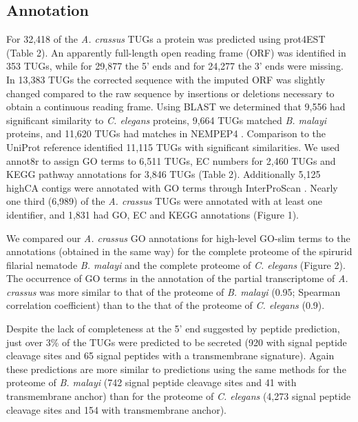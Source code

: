 \documentclass[10pt]{bmc_article}
\newenvironment{bmcformat}{\begin{raggedright}\baselineskip20pt\sloppy\setboolean{publ}{false}}{\end{raggedright}\baselineskip20pt\sloppy}
\begin{document}
\begin{bmcformat}












\subsection*{Annotation}

For
32,418
of the \textit{A. crassus} TUGs a protein was predicted using prot4EST
\cite{wasmuth_prot4est:_2004} (Table 2). An apparently full-length
open reading frame (ORF) was identified in
353 TUGs,
while for 29,877
the 5' ends and for
24,277 the 3'
ends were missing. In 13,383 TUGs the
corrected sequence with the imputed ORF was slightly changed compared
to the raw sequence by insertions or deletions necessary to obtain a
continuous reading frame. Using BLAST we determined that
9,556
had significant similarity to \textit{C. elegans} proteins,
9,664
TUGs matched \textit{B. malayi} proteins, and
11,620
TUGs had matches in NEMPEP4 \cite{parkinson_nembase:resource_2004,
  pmid21550347}. Comparison to the UniProt reference identified
11,115
TUGs with significant similarities. We used annot8r
\cite{schmid_annot8r:_2008} to assign GO terms to 6,511
TUGs, EC numbers for 2,460 TUGs and KEGG pathway annotations
for 3,846 TUGs (Table 2). Additionally 5,125
highCA contigs were annotated with GO terms through InterProScan
\cite{pmid11590104}. Nearly one third (6,989) of
the \textit{A. crassus} TUGs were annotated with at least one
identifier, and 1,831 had GO, EC and KEGG
annotations (Figure 1).

We compared our \textit{A. crassus} GO annotations for high-level
GO-slim terms to the annotations (obtained in the same way) for the
complete proteome of the spirurid filarial nematode \textit{B. malayi}
and the complete proteome of \textit{C. elegans} (Figure 2). The
occurrence of GO terms in the annotation of the partial transcriptome
of \textit{A. crassus} was more similar to that of the proteome of
\textit{B. malayi} (0.95; Spearman correlation coefficient) than to
the that of the proteome of \textit{C. elegans} (0.9).

Despite the lack of completeness at the 5' end suggested by peptide
prediction, just over 3\% of the TUGs were predicted to be secreted
(920 with signal peptide cleavage sites and
65 signal peptides with a transmembrane
signature). Again these predictions are more similar to predictions
using the same methods for the proteome of \textit{B. malayi} (742
signal peptide cleavage sites and 41 with transmembrane anchor) than
for the proteome of \textit{C. elegans} (4,273 signal peptide cleavage
sites and 154 with transmembrane anchor).


\end{bmcformat}
\end{document}
